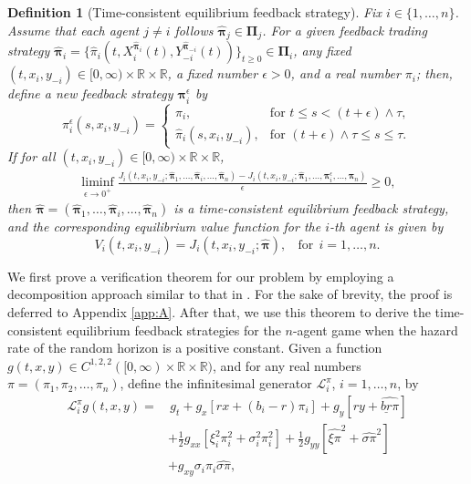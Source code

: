 \documentclass[11pt]{article}
\newtheorem{definition}{Definition}[section]
\numberwithin{equation}{section}
\newcommand{\bpi}{\boldsymbol{\pi}}
\providecommand{\smn}{{-}} %
\begin{document}
	\begin{definition}[Time-consistent equilibrium feedback strategy]\label{definitionE}
Fix $i \in \{1, \ldots, n\}$. Assume that each agent $j \neq i$ follows $\widehat{\bm{\pi}}_j \in \bm{\Pi}_j$. For a given feedback trading strategy \(\widehat{\bm{\pi}}_i = \{\widehat{\pi}_i(t, {X}^{\widehat{\bpi}_i}_i(t), Y^{\widehat{\bpi}_{\smn i}}_{\smn i}(t))\}_{t \ge 0} \in \boldsymbol{\Pi}_i\), any fixed \((t, x_i, y_{\smn i}) \in [0,\infty) \times \mathbb{R} \times \mathbb{R}\), a fixed number \(\epsilon > 0\), and a real number $\pi_i$; then, define a new feedback strategy \({\bm{\pi}}^\epsilon_i\) by
		\[
		\pi_i^\epsilon(s, x_i, y_{\smn i}) =
		\begin{cases}
			\pi_i, & \text{for } {t \leq s < (t+\epsilon) \wedge \tau,} \\
			\widehat{\pi}_i(s, x_i, y_{\smn i}), & \text{for } (t+\epsilon) \wedge \tau \leq s \leq \tau.
		\end{cases}
		\]		
		If for all \((t, x_i, y_{\smn i}) \in [0,\infty) \times \mathbb{R} \times \mathbb{R}\),
		\begin{align}
		\liminf_{\epsilon \to 0^+} \frac{J_i(t, x_i, y_{\smn i}; \widehat{\bm{\pi}}_1, \ldots, \widehat{\bm{\pi}}_i, \ldots, \widehat{\bm{\pi}}_n) - J_i(t, x_i, y_{\smn i}; \widehat{\bm{\pi}}_1, \ldots, \bm{\pi}^\epsilon_i, \ldots, \widehat{\bm{\pi}}_n)}{\epsilon} \geq 0, \label{eq:limit_equi}
		\end{align}
		then $\widehat{\bpi}=(\widehat{\bm{\pi}}_1, \ldots, \widehat{\bm{\pi}}_i, \ldots, \widehat{\bm{\pi}}_n)$ is a time-consistent equilibrium feedback strategy,
		and  the corresponding equilibrium value function for the \(i\)-th agent is given by
		\[
		V_i(t, x_i, y_{\smn i}) = J_i(t, x_i, y_{\smn i}; \widehat{\bm{\pi}}), ~~~~\text{for}~~i=1,\ldots,n.
		\]
	\end{definition}
	We first prove a verification theorem for our problem by employing a decomposition approach similar to that in \citet{kryger2010some}. For the sake of brevity, the proof is deferred to Appendix \ref{app:A}. After that, we use this theorem to derive the time-consistent equilibrium feedback strategies for the \(n\)-agent game when the hazard rate of the random horizon is a positive constant. Given a function \(g(t,x,y) \in C^{1,2,2}([0,\infty) \times \mathbb{R} \times \mathbb{R})\), and for any real numbers $\pi = (\pi_1, \pi_2, \ldots, \pi_n)$, define the infinitesimal generator \(\mathcal{L}_i^{\pi}\), \(i = 1,\ldots,n\), by
	\begin{align}
		\mathcal{L}_i^{{\pi}} g(t,x,y) = & \, g_t + g_x[rx + (b_i - r)\pi_i] + g_y[ry + \widehat{\underline{br}\pi}] \\
		& + \frac{1}{2} g_{xx} \left[\xi_i^2 \pi_i^2 + \sigma_i^2 \pi_i^2\right] + \frac{1}{2} g_{yy} \left[\widehat{\xi\pi}^2 + \widehat{\sigma\pi}^2\right] \\
		& + g_{xy} \sigma_i \pi_i \widehat{\sigma\pi},
	\end{align}
\end{document}
